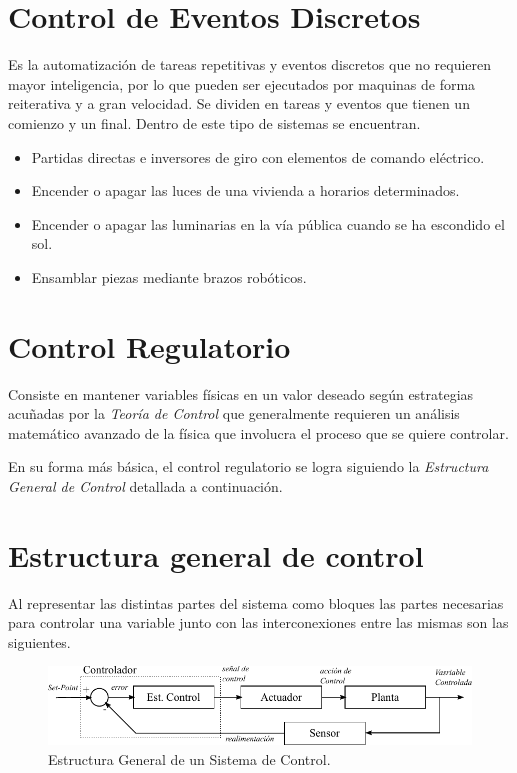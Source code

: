 \documentclass[letterpaper, 10pt]{report}
\begin{document}
	\section{Control de Eventos Discretos}
	Es la automatización de tareas repetitivas y eventos discretos que no requieren mayor inteligencia, por lo que pueden ser ejecutados por maquinas de forma reiterativa y a gran velocidad. Se dividen en tareas y eventos que tienen un comienzo y un final. Dentro de este tipo de sistemas se encuentran.
	\begin{itemize}
		\item Partidas directas e inversores de giro con elementos de comando eléctrico.
		\item Encender o apagar las luces de una vivienda a horarios determinados.
		\item Encender o apagar las luminarias en la vía pública cuando se ha escondido el sol.
		\item Ensamblar piezas mediante brazos robóticos.
	\end{itemize}	
	
	\section{Control Regulatorio}
	
	Consiste en mantener variables físicas en un valor deseado según estrategias acuñadas por la \emph{Teoría de Control} que generalmente requieren un análisis matemático avanzado de la física que involucra el proceso que se quiere controlar.
	
	En su forma más básica, el control regulatorio se logra siguiendo la \emph{Estructura General de Control} detallada a continuación.
	
	\section{Estructura general de control}
	Al representar las distintas partes del sistema como bloques las partes necesarias para controlar una variable junto con las interconexiones entre las mismas son las siguientes. 
	
	\begin{figure}[h]
		\centering
		\includegraphics[scale=0.9]{egControl.pdf}
		\caption{Estructura General de un Sistema de Control.\label{egControl}}	
	\end{figure}
\end{document}
